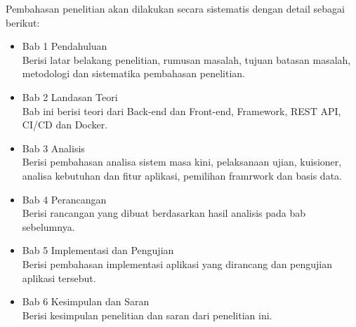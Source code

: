 Pembahasan penelitian akan dilakukan secara sistematis dengan detail sebagai berikut:

\begin{itemize}
    \item Bab 1 Pendahuluan \\
        Berisi latar belakang penelitian, rumusan masalah, tujuan batasan masalah, metodologi dan sistematika pembahasan penelitian.
    
    \item Bab 2 Landasan Teori \\
        Bab ini berisi teori dari Back-end dan Front-end, Framework, REST API, CI/CD dan Docker.
        
    \item Bab 3 Analisis \\
        Berisi pembahasan analisa sistem masa kini, pelaksanaan ujian, kuisioner, analisa kebutuhan dan fitur aplikasi, pemilihan framrwork dan basis data.
        
        
    \item Bab 4 Perancangan \\
        Berisi rancangan yang dibuat berdasarkan hasil analisis pada bab sebelumnya.
    
    \item Bab 5 Implementasi dan Pengujian \\
        Berisi pembahasan implementasi aplikasi yang dirancang dan pengujian aplikasi tersebut.
        
    \item Bab 6 Kesimpulan dan Saran \\
        Berisi kesimpulan penelitian dan saran dari penelitian ini.
\end{itemize}